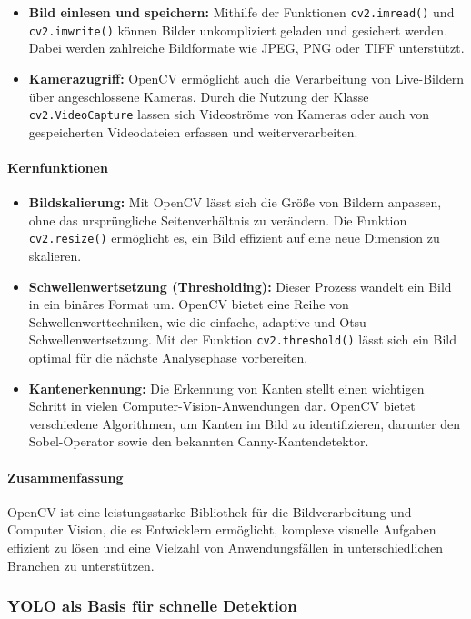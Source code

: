 \begin{itemize}
    \item \textbf{Bild einlesen und speichern:} Mithilfe der Funktionen \texttt{cv2.imread()} und \texttt{cv2.imwrite()} können Bilder unkompliziert geladen und gesichert werden. Dabei werden zahlreiche Bildformate wie JPEG, PNG oder TIFF unterstützt.
    \item \textbf{Kamerazugriff:} OpenCV ermöglicht auch die Verarbeitung von Live-Bildern über angeschlossene Kameras. Durch die Nutzung der Klasse \texttt{cv2.VideoCapture} lassen sich Videoströme von Kameras oder auch von gespeicherten Videodateien erfassen und weiterverarbeiten.
\end{itemize}

\paragraph{Kernfunktionen}
\begin{itemize}
    \item \textbf{Bildskalierung:} Mit OpenCV lässt sich die Größe von Bildern anpassen, ohne das ursprüngliche Seitenverhältnis zu verändern. Die Funktion \texttt{cv2.resize()} ermöglicht es, ein Bild effizient auf eine neue Dimension zu skalieren.
    \item \textbf{Schwellenwertsetzung (Thresholding):} Dieser Prozess wandelt ein Bild in ein binäres Format um. OpenCV bietet eine Reihe von Schwellenwerttechniken, wie die einfache, adaptive und Otsu-Schwellenwertsetzung. Mit der Funktion \texttt{cv2.threshold()} lässt sich ein Bild optimal für die nächste Analysephase vorbereiten.
    \item \textbf{Kantenerkennung:} Die Erkennung von Kanten stellt einen wichtigen Schritt in vielen Computer-Vision-Anwendungen dar. OpenCV bietet verschiedene Algorithmen, um Kanten im Bild zu identifizieren, darunter den Sobel-Operator sowie den bekannten Canny-Kantendetektor.
\end{itemize}

\paragraph{Zusammenfassung}
OpenCV ist eine leistungsstarke Bibliothek für die Bildverarbeitung und Computer Vision, die es Entwicklern ermöglicht, komplexe visuelle Aufgaben effizient zu lösen und eine Vielzahl von Anwendungsfällen in unterschiedlichen Branchen zu unterstützen.

\subsubsection{YOLO als Basis für schnelle Detektion}


